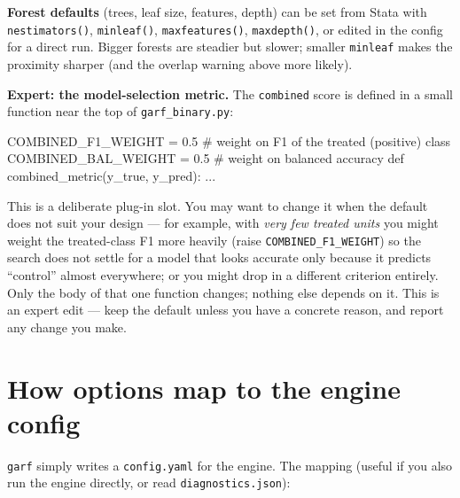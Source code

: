 \documentclass[11pt,a4paper]{article}
\newcommand{\code}[1]{\texttt{#1}}
\begin{document}
\medskip
\noindent\textbf{Forest defaults} (trees, leaf size, features, depth) can be set from Stata with
\code{nestimators()}, \code{minleaf()}, \code{maxfeatures()}, \code{maxdepth()}, or edited in the
config for a direct run. Bigger forests are steadier but slower; smaller \code{minleaf} makes the
proximity sharper (and the overlap warning above more likely).

\medskip
\noindent\textbf{Expert: the model-selection metric.} The \code{combined} score is defined in a
small function near the top of \code{garf\_binary.py}:
\begin{stata}
COMBINED_F1_WEIGHT  = 0.5   # weight on F1 of the treated (positive) class
COMBINED_BAL_WEIGHT = 0.5   # weight on balanced accuracy
def combined_metric(y_true, y_pred): ...
\end{stata}
This is a deliberate plug-in slot. You may want to change it when the default does not suit your
design --- for example, with \emph{very few treated units} you might weight the treated-class F1
more heavily (raise \code{COMBINED\_F1\_WEIGHT}) so the search does not settle for a model that
looks accurate only because it predicts ``control'' almost everywhere; or you might drop in a
different criterion entirely. Only the body of that one function changes; nothing else depends on
it. This is an expert edit --- keep the default unless you have a concrete reason, and report any
change you make.

\section{How options map to the engine config}

\code{garf} simply writes a \code{config.yaml} for the engine. The mapping (useful if you also
run the engine directly, or read \code{diagnostics.json}):
\end{document}
